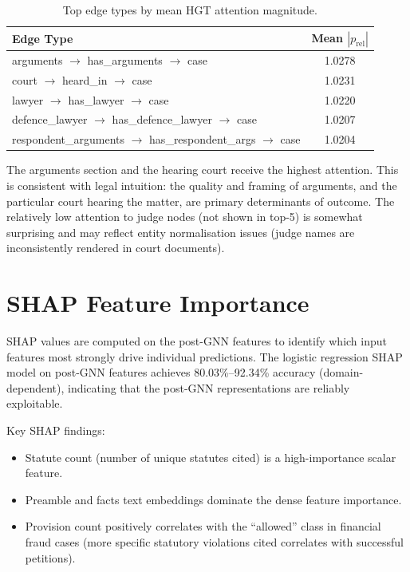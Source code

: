 \documentclass[12pt,a4paper]{report}
\begin{document}
\begin{table}[H]
  \centering
  \caption{Top edge types by mean HGT attention magnitude.}
  \label{tab:attention}
  \begin{tabular}{lc}
    \toprule
    \textbf{Edge Type} & \textbf{Mean $|p_\text{rel}|$} \\
    \midrule
    arguments $\to$ has\_arguments $\to$ case & 1.0278 \\
    court $\to$ heard\_in $\to$ case & 1.0231 \\
    lawyer $\to$ has\_lawyer $\to$ case & 1.0220 \\
    defence\_lawyer $\to$ has\_defence\_lawyer $\to$ case & 1.0207 \\
    respondent\_arguments $\to$ has\_respondent\_args $\to$ case & 1.0204 \\
    \bottomrule
  \end{tabular}
\end{table}

The arguments section and the hearing court receive the highest attention. This is consistent with legal intuition: the quality and framing of arguments, and the particular court hearing the matter, are primary determinants of outcome. The relatively low attention to judge nodes (not shown in top-5) is somewhat surprising and may reflect entity normalisation issues (judge names are inconsistently rendered in court documents).

\section{SHAP Feature Importance}
\label{sec:shap}

SHAP \citep{lundberg2017unified} values are computed on the post-GNN features to identify which input features most strongly drive individual predictions. The logistic regression SHAP model on post-GNN features achieves 80.03\%--92.34\% accuracy (domain-dependent), indicating that the post-GNN representations are reliably exploitable.

Key SHAP findings:
\begin{itemize}
  \item Statute count (number of unique statutes cited) is a high-importance scalar feature.
  \item Preamble and facts text embeddings dominate the dense feature importance.
  \item Provision count positively correlates with the ``allowed'' class in financial fraud cases (more specific statutory violations cited correlates with successful petitions).
\end{itemize}
\end{document}

